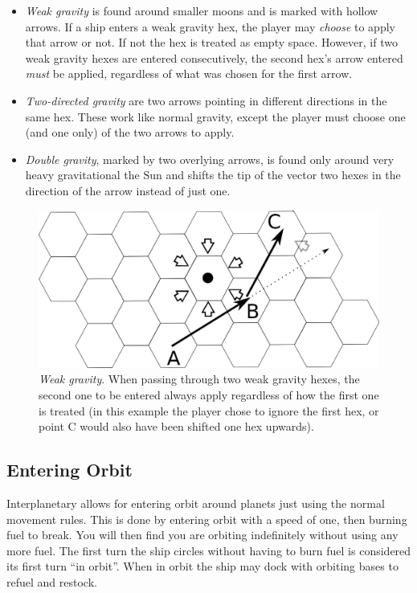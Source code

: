 \documentclass[a4paper,12pt,notitlepage,twocolumn]{article}
\begin{document}
\begin{itemize}
\item \emph{Weak gravity} is found around smaller moons and is marked with
  hollow arrows. If a ship enters a weak gravity hex, the player may
  \emph{choose} to apply that arrow or not. If not the hex is treated as
  empty space. However, if two weak gravity hexes are entered
  consecutively, the second hex's arrow entered \emph{must} be
  applied, regardless of what was chosen for the first arrow.

\item \emph{Two-directed gravity} are two arrows pointing in different
  directions in the same hex. These work like normal
  gravity, except the player must choose one (and one only) of the two
  arrows to apply.

\item  \emph{Double gravity}, marked by two overlying arrows, is found only
  around very heavy gravitational the Sun and shifts the tip of the vector two hexes in the
  direction of the arrow instead of just one.
\end{itemize}
\begin{figure}[h!]\centering  
  \includegraphics[width=0.5 \textwidth]{data/move_7.eps}  
  \caption{\footnotesize \emph{Weak gravity}. When passing through two weak gravity hexes, the second one
  to be entered always apply regardless of how the first one is
  treated (in this example the player chose to ignore the first hex,
  or point C would also have been shifted one hex upwards).}
\label{fig:7}
\end{figure}

\subsection{Entering Orbit}

Interplanetary allows for entering orbit around planets just using the normal
movement rules. This is done by entering orbit with a speed of
one, then burning fuel to break. You will then find you are orbiting
indefinitely without using any more fuel. The first turn the ship circles
without having to burn fuel is considered its first turn ``in orbit''.
When in orbit the ship may dock with orbiting bases to refuel and restock.
\end{document}
